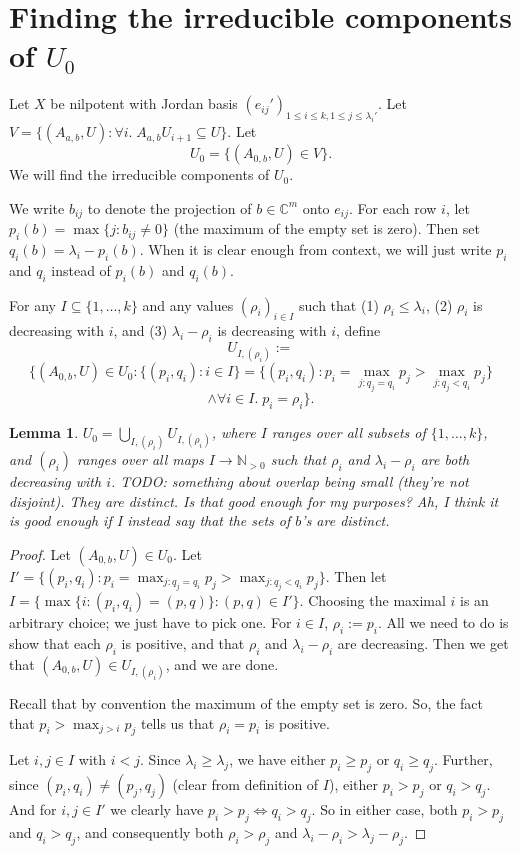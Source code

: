 \documentclass[12pt,psamsfonts]{article}
\newtheorem{lemma}[theorem]{Lemma}
\begin{document}
\section{Finding the irreducible components of \(U_0\)}
Let \(X\) be nilpotent with Jordan basis \((e_{ij}')_{1 \leq i \leq k, 1 \leq j \leq \lambda_i'}\).
Let \(V = \{(A_{a,b}, U) : \forall i. \; A_{a,b} U_{i + 1} \subseteq U\}\).
Let
\[U_0 = \{(A_{0,b}, U) \in V\}.\]
We will find the irreducible components of \(U_0\).
\par We write \(b_{ij}\) to denote the projection of \(b \in \mathbb{C}^m\) onto \(e_{ij}\).
For each row \(i\), let \(p_i(b) = \max\{j : b_{ij} \neq 0\}\) (the maximum of the empty set is zero).
Then set \(q_i(b) = \lambda_i - p_i(b)\).
When it is clear enough from context, we will just write \(p_i\) and \(q_i\) instead of \(p_i(b)\) and \(q_i(b)\).
\par For any \(I \subseteq \{1, ..., k\}\) and any values \((\rho_i)_{i \in I}\) such that (1) \(\rho_i \leq \lambda_i\), (2) \(\rho_i\) is decreasing with \(i\), and (3) \(\lambda_i - \rho_i\) is decreasing with \(i\), define 
\[U_{I, (\rho_i)} := \] 
\[\{(A_{0, b}, U) \in U_0 : \{(p_i, q_i) : i \in I\} = \{(p_i, q_i) : p_i = \max_{j : q_j = q_i} p_j > \max_{j : q_j < q_i} p_j \} \] 
\[\land \forall i \in I. \; p_i = \rho_i \}.\]
\begin{lemma}
    \(U_0 = \bigcup_{I, (\rho_i)} U_{I, (\rho_i)}\), where \(I\) ranges over all subsets of \(\{1, ..., k\}\), and \((\rho_i)\) ranges over all maps \(I \to \mathbb{N}_{>0}\) such that \(\rho_i\) and \(\lambda_i - \rho_i\) are both decreasing with \(i\).
    TODO: something about overlap being small (they're not disjoint).  
    They are distinct.
    Is that good enough for my purposes?
    Ah, I think it is good enough if I instead say that the sets of \(b\)'s are distinct.
\end{lemma}
\begin{proof}
    Let \((A_{0, b}, U) \in U_0\).
    Let \(I' = \{(p_i, q_i) : p_i = \max_{j : q_j = q_i} p_j > \max_{j : q_j < q_i} p_j\}\).
    Then let \(I = \{\max\{i : (p_i, q_i) = (p, q)\} : (p, q) \in I'\}\).
    Choosing the maximal \(i\) is an arbitrary choice; we just have to pick one.
    For \(i \in I\), \(\rho_i := p_i\).
    All we need to do is show that each \(\rho_i\) is positive, and that \(\rho_i\) and \(\lambda_i - \rho_i\) are decreasing.
    Then we get that \((A_{0,b}, U) \in U_{I, (\rho_i)}\), and we are done.
    \par Recall that by convention the maximum of the empty set is zero.
    So, the fact that \(p_i > \max_{j > i} p_j\) tells us that \(\rho_i = p_i\) is positive.
    \par Let \(i, j \in I\) with \(i < j\).
    Since \(\lambda_i \geq \lambda_j\), we have either \(p_i \geq p_j\) or \(q_i \geq q_j\).
    Further, since \((p_i, q_i) \neq (p_j, q_j)\) (clear from definition of \(I\)), either \(p_i > p_j\) or \(q_i > q_j\).
    And for \(i, j \in I'\) we clearly have \(p_i > p_j \iff q_i > q_j\).
    So in either case, both \(p_i > p_j\) and \(q_i > q_j\), and consequently both \(\rho_i > \rho_j\) and \(\lambda_i - \rho_i > \lambda_j - \rho_j\).
\end{proof}
\end{document}
